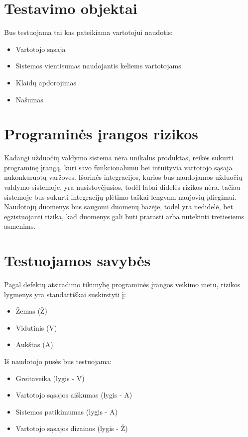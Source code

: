 \documentclass{VUMIFPSkursinis}
\begin{document}
    
    \section{Testavimo objektai}
    
    Bus testuojama tai kas pateikiama vartotojui naudotis:
    
    \begin{itemize}
    	\item Vartotojo sąsaja
    	\item Sistemos vientisumas naudojantis keliems vartotojams
    	\item Klaidų apdorojimas
    	\item Našumas
    \end{itemize}


    \section{Programinės įrangos rizikos}

    Kadangi užduočių valdymo sistema nėra unikalus produktas, reikės sukurti programinę įrangą,
     kuri savo funkcionalumu bei intuityvia vartotojo sąsaja nukonkuruotų varžoves.
    Išorinės integracijos, kurios bus naudojamos užduočių valdymo sistemoje, yra nusistovėjusios, todėl labai didelės
     rizikos nėra, tačiau sistemoje bus sukurti integracijų plėtimo taškai lengvam naujovių įdiegimui.
    Naudotojų duomenys bus saugomi duomenų bazėje, todėl yra nedidelė, bet egzistuojanti rizika, kad duomenys gali būti
     prarasti arba nutekinti tretiesiems asmenims.


    \section{Testuojamos savybės}

    Pagal defektų atsiradimo tikimybę programinės įrangos veikimo metu, rizikos lygmenys yra standartiškai suskirstyti į:

    \begin{itemize}
    	\item Žemas (Ž)
    	\item Vidutinis (V)
    	\item Aukštas (A)
    \end{itemize}

    Iš naudotojo pusės bus testuojama:

    \begin{itemize}
    	\item Greitaveika (lygis - V)
    	\item Vartotojo sąsajos aiškumas (lygis - A)
    	\item Sistemos patikimumas (lygis - A)
    	\item Vartotojo sąsajos dizainos (lygis - Ž)
    \end{itemize}
\end{document}
